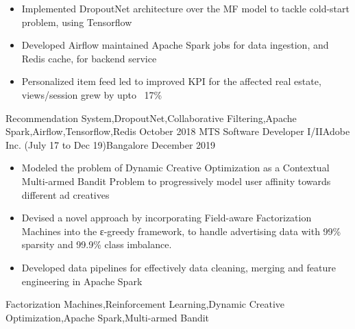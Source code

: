 \begin{experiences}
{\begin{itemize}
                        \item Implemented DropoutNet architecture over the MF model to tackle cold-start problem, using Tensorflow
                        \item Developed Airflow maintained Apache Spark jobs for data ingestion, and Redis cache, for backend service
                        \item Personalized item feed led to improved KPI for the affected real estate, views/session grew by upto ~17\%
                      \end{itemize}
                    }
                    {Recommendation System,DropoutNet,Collaborative Filtering,Apache Spark,Airflow,Tensorflow,Redis}
  \emptySeparator
  \experience
  {October 2018}  {MTS Software Developer I/II}{Adobe Inc. (July 17 to Dec 19)}{Bangalore}
  {December 2019} {
                    \begin{itemize}
                      \item Modeled the problem of Dynamic Creative Optimization as a Contextual Multi-armed Bandit Problem to progressively model user affinity towards different ad creatives
                      \item Devised a novel approach by incorporating Field-aware Factorization Machines into the ε-greedy framework, to handle advertising data with 99\% sparsity and 99.9\% class imbalance.
                      \item Developed data pipelines for effectively data cleaning, merging and feature engineering in Apache Spark
                    \end{itemize}
                  }
                  {Factorization Machines,Reinforcement Learning,Dynamic Creative Optimization,Apache Spark,Multi-armed Bandit}
\end{experiences}
